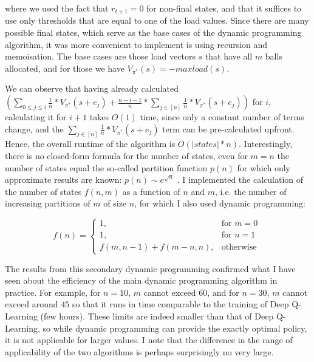 where we used the fact that $r_{t+1}=0$ for non-final states, and that it suffices to use only thresholds that are equal to one of the load values. Since there are many possible final states, which serve as the base cases of the dynamic programming algorithm, it was more convenient to implement is using recursion and memoisation. The base cases are those load vectors $s$ that have all $m$ balls allocated, and for those we have $V_{\pi^*}(s)=-maxload(s)$. 


We can observe that having already calculated $(\sum_{0\leq j \leq i} \frac{1}{n}*V_{\pi^*}(s+e_j) + \frac{n-i-1}{n} * \sum_{j \in [n]} \frac{1}{n}*V_{\pi^*}(s+e_j))$ for $i$, calculating it for $i+1$ takes $O(1)$ time, since only a constant number of terms change, and the $\sum_{j \in [n]} \frac{1}{n}*V_{\pi^*}(s+e_j)$ term can be pre-calculated upfront. Hence, the overall runtime of the algorithm is $O(|states|*n)$. Interestingly, there is no closed-form formula for the number of states, even for $m=n$ the number of states equal the so-called partition function $p(n)$ for which only approximate results are known: $p(n) \sim e^{\sqrt{n}}$ \cite{hardy1918partitionfunction}. I implemented the calculation of the number of states $f(n, m)$ as a function of $n$ and $m$, i.e. the number of increasing partitions of $m$ of size $n$, for which I also used dynamic programming:


\begin{equation} \label{eq: numberofpartitions}
    f(n) = \begin{cases}
        1, & \text{for } m=0\\
        1, & \text{for } n=1\\
        f(m,n-1)+f(m-n,n), & \text{otherwise }
    \end{cases}
\end{equation}


The results from this secondary dynamic programming confirmed what I have seen about the efficiency of the main dynamic programming algorithm in practice. For example, for $n=10$, $m$ cannot exceed $60$, and for $n=30$, $m$ cannot exceed around $45$ so that it runs in time comparable to the training of Deep Q-Learning (few hours). These limits are indeed smaller than that of Deep Q-Learning, so while dynamic programming can provide the exactly optimal policy, it is not applicable for larger values. I note that the difference in the range of applicability of the two algorithms is perhaps surprisingly no very large. 


